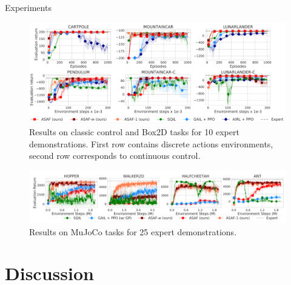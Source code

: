 \documentclass[10pt,aspectratio=169]{beamer}
\begin{document}
\begin{frame}{Experiments}
	\begin{figure}
        \centering
        \includegraphics[width=0.8\linewidth]{paper_fig/exp_atari.png}
        \caption{Results on classic control and Box2D tasks for 10 expert demonstrations. First row contains discrete actions environments, second row corresponds to continuous control.}
    \end{figure}

    \begin{figure}
        \centering
        \includegraphics[width=0.8\linewidth]{paper_fig/exp_mujoco.png}
        \caption{Results on MuJoCo tasks for 25 expert demonstrations.}
    \end{figure}

\end{frame}

\section{Discussion}
\end{document}
